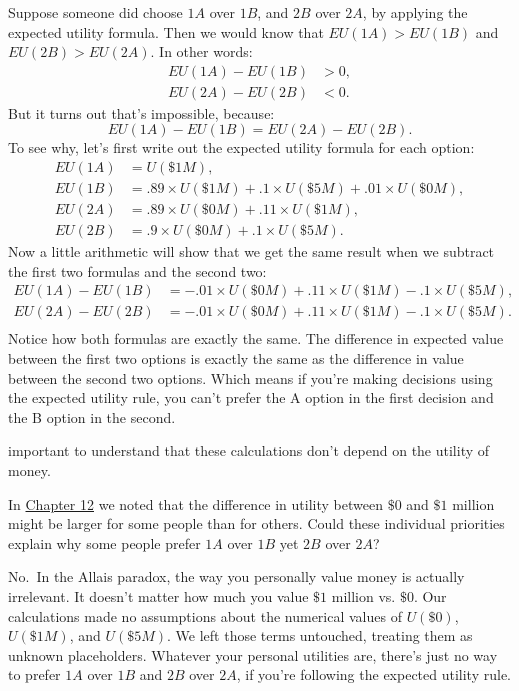 \documentclass[justified]{tufte-book}
\renewcommand{\u}{U}
\newcommand{\EU}{EU}
\theoremstyle{definition}
\theoremstyle{definition}
\theoremstyle{definition}
\theoremstyle{remark}
\begin{document}
Suppose someone did choose \(1A\) over \(1B\), and \(2B\) over \(2A\),
by applying the expected utility formula. Then we would know that
\(\EU(1A) > \EU(1B)\) and \(\EU(2B) > \EU(2A)\). In other words: \[
  \begin{aligned}
    \EU(1A) - \EU(1B) &> 0,\\
    \EU(2A) - \EU(2B) &< 0.
  \end{aligned}
\] But it turns out that's impossible, because:
\[ \EU(1A) - \EU(1B) = \EU(2A) - \EU(2B). \] To see why, let's first
write out the expected utility formula for each option: \[
  \begin{aligned}
     \EU(1A) &= \u(\$1M),\\
     \EU(1B) &= .89 \times \u(\$1M) + .1 \times \u(\$5M) + .01 \times \u(\$0M),\\
     \EU(2A) &= .89 \times \u(\$0M) + .11 \times \u(\$1M),\\
     \EU(2B) &= .9 \times \u(\$0M) + .1 \times\u(\$5M).
  \end{aligned}
\] Now a little arithmetic will show that we get the same result when we
subtract the first two formulas and the second two: \[
  \begin{aligned}
    \EU(1A) - \EU(1B) &= -.01 \times \u(\$0M) + .11 \times \u(\$1M) - .1 \times \u(\$5M),\\
    \EU(2A) - \EU(2B) &= -.01 \times \u(\$0M) + .11 \times \u(\$1M) - .1 \times \u(\$5M).\\
  \end{aligned}
\] Notice how both formulas are exactly the same. The difference in
expected value between the first two options is exactly the same as the
difference in value between the second two options. Which means if
you're making decisions using the expected utility rule, you can't
prefer the A option in the first decision and the B option in the
second.

 important to understand that these calculations don't
depend on the utility of money.

In \protect\hyperlink{utility}{Chapter 12} we noted that the difference
in utility between \(\$0\) and \(\$1\) million might be larger for some
people than for others. Could these individual priorities explain why
some people prefer \(1A\) over \(1B\) yet \(2B\) over \(2A\)?

No.~In the Allais paradox, the way you personally value money is
actually irrelevant. It doesn't matter how much you value \(\$1\)
million vs. \(\$0\). Our calculations made no assumptions about the
numerical values of \(\u(\$0)\), \(\u(\$1M)\), and \(\u(\$5M)\). We left
those terms untouched, treating them as unknown placeholders. Whatever
your personal utilities are, there's just no way to prefer \(1A\) over
\(1B\) and \(2B\) over \(2A\), if you're following the expected utility
rule.
\end{document}
